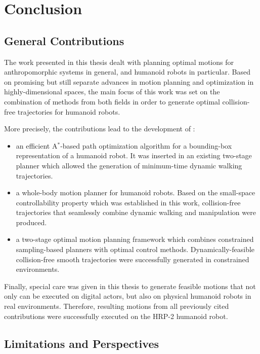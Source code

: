 \chapter{Conclusion}
\label{chap:conclusion}

\section{General Contributions}

The work presented in this thesis dealt with planning optimal motions
for anthropomorphic systems in general, and humanoid robots in
particular. Based on promising but still separate advances in
motion planning and optimization in highly-dimensional spaces, the
main focus of this work was set on the combination of methods from
both fields in order to generate optimal collision-free trajectories
for humanoid robots. 

More precisely, the contributions lead to the development of :
\begin{itemize}
\item an efficient A$^*$-based path optimization algorithm for a
  bounding-box representation of a humanoid robot. It was inserted in
  an existing two-stage planner which allowed the generation of
  minimum-time dynamic walking trajectories.
\item a whole-body motion planner for humanoid robots. Based on the
  small-space controllability property which was established in this
  work, collision-free trajectories that seamlessly combine dynamic
  walking and manipulation were produced.
\item a two-stage optimal motion planning framework which combines
  constrained sampling-based planners with optimal control
  methods. Dynamically-feasible collision-free smooth trajectories
  were successfully generated in constrained environments.
\end{itemize}

Finally, special care was given in this thesis to generate feasible
motions that not only can be executed on digital actors, but also on
physical humanoid robots in real environments. Therefore, resulting
motions from all previously cited contributions were successfully
executed on the HRP-2 humanoid robot.

\section{Limitations and Perspectives}

